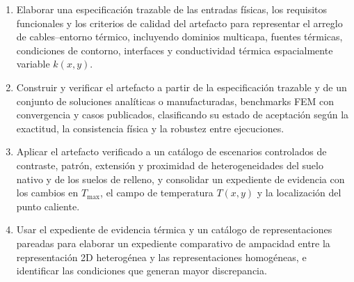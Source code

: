 \documentclass[11pt,a4paper,oneside]{report}
\newcommand{\Tmax}{T_{\max}}
\newcommand{\kx}{k(x,y)}
\begin{document}
\begin{enumerate}[label=OE\arabic*.]
  \item Elaborar una especificación trazable de las entradas físicas, los requisitos funcionales y los criterios de calidad del artefacto para representar el arreglo de cables--entorno térmico, incluyendo dominios multicapa, fuentes térmicas, condiciones de contorno, interfaces y conductividad térmica espacialmente variable $\kx$.
  \item Construir y verificar el artefacto a partir de la especificación trazable y de un conjunto de soluciones analíticas o manufacturadas, benchmarks FEM con convergencia y casos publicados, clasificando su estado de aceptación según la exactitud, la consistencia física y la robustez entre ejecuciones.
  \item Aplicar el artefacto verificado a un catálogo de escenarios controlados de contraste, patrón, extensión y proximidad de heterogeneidades del suelo nativo y de los suelos de relleno, y consolidar un expediente de evidencia con los cambios en $\Tmax$, el campo de temperatura $T(x,y)$ y la localización del punto caliente.
  \item Usar el expediente de evidencia térmica y un catálogo de representaciones pareadas para elaborar un expediente comparativo de ampacidad entre la representación 2D heterogénea y las representaciones homogéneas, e identificar las condiciones que generan mayor discrepancia.
\end{enumerate}
\end{document}
